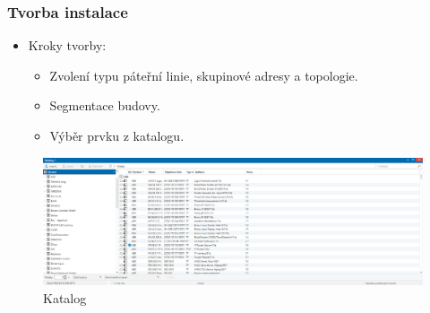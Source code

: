 \documentclass[%
  12pt,       				%
	t,                  %
	aspectratio=1610,   %
	unicode,						%
]{beamer}				    	%
\begin{document}
\begin{frame} 
	\frametitle{Tvorba instalace}
	\begin{itemize}
	    \item Kroky tvorby:
	        \begin{itemize}
	            \item Zvolení typu páteřní linie, skupinové adresy a topologie.
	            \item Segmentace budovy.
	            \item Výběr prvku z katalogu.
	        \end{itemize}
	\end{itemize}
			\begin{figure}%
				\centering
				\vspace{0.2cm}	              %
				\includegraphics[width=1\columnwidth]{obrazky/Katalog.png}
				\caption{Katalog}
			\end{figure}
\end{frame}
\end{document}
